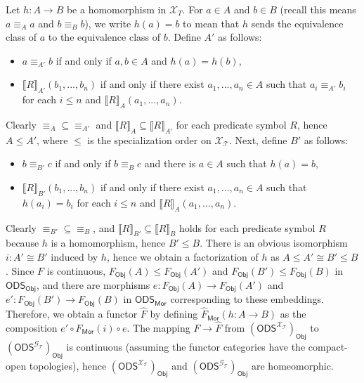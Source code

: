 \documentclass{article}
\theoremstyle{plain}
\def\cal#1{{\mathcal #1}}
\def\calG{{\cal G}}
\def\calT{{\cal T}}
\def\calX{{\cal X}}
\newcommand{\ODS}{{\mathsf{ODS}}}
\newcommand{\Mor}{\mathsf{Mor}}
\newcommand{\Obj}{\mathsf{Obj}}
\begin{document}
Let $h\colon A\to B$ be a homomorphism in $\calX_T$. For $a\in A$ and $b\in B$ (recall this means $a \equiv_A a$ and $b \equiv_B b$), we write $h(a)=b$ to mean that $h$ sends the equivalence class of $a$ to the equivalence class of $b$. Define $A'$ as follows:
\begin{itemize}
\item
$a \equiv_{A'} b$ if and only if $a,b\in A$ and $h(a) = h(b)$,
\item
$\llbracket R \rrbracket_{A'}(b_1, ... , b_n)$ if and only if there exist $a_1,...,a_n  \in A$ such that $a_i \equiv_{A'} b_i$ for each $i \leq n$ and $\llbracket R\rrbracket_A(a_1,...,a_n)$.
\end{itemize}
Clearly $\equiv_A \subseteq \equiv_{A'}$ and $\llbracket R \rrbracket_A \subseteq \llbracket R \rrbracket_{A'}$ for each predicate symbol $R$, hence $A \leq A'$, where $\leq$ is the specialization order on $\calX_\calT$. Next, define $B'$ as follows:
\begin{itemize}
\item
$b \equiv_{B'} c$ if and only if $b \equiv_B c$ and there is $a \in A$ such that $h(a)=b$,
\item
$\llbracket R \rrbracket_{B'}(b_1, ... , b_n)$ if and only if there exist $a_1,...,a_n  \in A$ such that $h(a_i)= b_i$ for each $i \leq n$ and $\llbracket R\rrbracket_A(a_1,...,a_n)$.
\end{itemize}
Clearly $\equiv_{B'}\subseteq\equiv_B$, and $\llbracket R \rrbracket_{B'} \subseteq \llbracket R \rrbracket_{B}$ holds for each predicate symbol $R$ because $h$ is a homomorphism, hence $B' \leq B$. There is an obvious isomorphism $i\colon A' \cong B'$ induced by $h$, hence we obtain a factorization of $h$ as $A \leq A' \cong B' \leq B$. Since $F$ is continuous, $F_\Obj(A) \leq F_\Obj(A')$ and $F_\Obj(B') \leq F_\Obj(B)$ in $\ODS_\Obj$, and there are morphisms $e \colon F_\Obj(A) \to F_\Obj(A')$ and $e' \colon F_\Obj(B') \to F_\Obj(B)$ in $\ODS_\Mor$ corresponding to these embeddings. Therefore, we obtain a functor $\hat{F}$ by defining $\hat{F}_\Mor(h\colon A\to B)$ as the composition $e'\circ F_\Mor(i) \circ e$. The mapping $F \to \hat{F}$ from $(\ODS^{\calX_\calT})_\Obj$ to $(\ODS^{\calG_\calT})_\Obj$ is continuous (assuming the functor categories have the compact-open topologies), hence $(\ODS^{\calX_\calT})_\Obj$ and $(\ODS^{\calG_\calT})_\Obj$ are homeomorphic.
\end{document}
